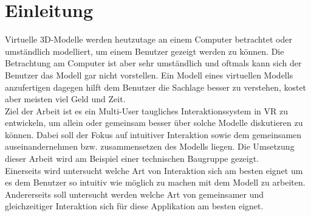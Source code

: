 \chapter{Einleitung}
\label{ch:Einleitung}

Virtuelle 3D-Modelle werden heutzutage an einem Computer betrachtet oder umständlich modelliert, um einem Benutzer gezeigt werden zu können. Die Betrachtung am Computer ist aber sehr umständlich und oftmals kann sich der Benutzer das Modell gar nicht vorstellen. Ein Modell eines virtuellen Modells anzufertigen dagegen hilft dem Benutzer die Sachlage besser zu verstehen, kostet aber meisten viel Geld und Zeit. \\

\noindent Ziel der Arbeit ist es ein Multi-User taugliches Interaktionssystem in VR zu entwickeln, um allein oder gemeinsam besser über solche Modelle diskutieren zu können. Dabei soll der Fokus auf intuitiver Interaktion sowie dem gemeinsamen auseinandernehmen bzw. zusammensetzen des Modells liegen. Die Umsetzung dieser Arbeit wird am Beispiel einer technischen Baugruppe gezeigt. \\

\noindent Einerseits wird untersucht welche Art von Interaktion sich am besten eignet um es dem Benutzer so intuitiv wie möglich zu machen mit dem Modell zu arbeiten. Andererseits soll untersucht werden welche Art von gemeinsamer und gleichzeitiger Interaktion sich für diese Applikation am besten eignet.